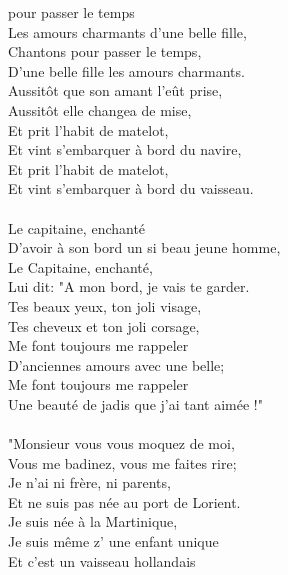 \vspace{-0.3cm}
 pour passer le temps
\\Les amours charmants d'une belle fille,
\\Chantons pour passer le temps,
\\D'une belle fille les amours charmants.
\\Aussitôt que son amant l'eût prise,
\\Aussitôt elle changea de mise,
\\Et prit l'habit de matelot,
\\Et vint s'embarquer à bord du navire,
\\Et prit l'habit de matelot,
\\Et vint s'embarquer à bord du vaisseau.
\\\\Le capitaine, enchanté
\\D'avoir à son bord un si beau jeune homme,
\\Le Capitaine, enchanté,
\\Lui dit: "A mon bord, je vais te garder.
\\Tes beaux yeux, ton joli visage,
\\Tes cheveux et ton joli corsage,
\\Me font toujours me rappeler
\\D'anciennes amours avec une belle;
\\Me font toujours me rappeler
\\Une beauté de jadis que j'ai tant aimée !"
\\\\"Monsieur vous vous moquez de moi,
\\Vous me badinez, vous me faites rire;
\\Je n'ai ni frère, ni parents,
\\Et ne suis pas née au port de Lorient.
\\Je suis née à la Martinique,
\\Je suis même z' une enfant unique
\\Et c'est un vaisseau hollandais
